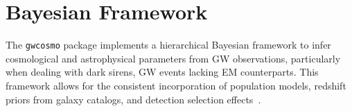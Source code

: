 %

\section{Bayesian Framework}
The \texttt{gwcosmo} package implements a hierarchical Bayesian framework to infer cosmological and astrophysical parameters from \ac{GW} observations, particularly when dealing with dark sirens, \ac{GW} events lacking \ac{EM} counterparts. This framework allows for the consistent incorporation of population models, redshift priors from galaxy catalogs, and detection selection effects~\citep{chen2024testing}.

